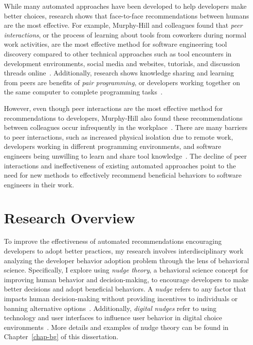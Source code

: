 
While many automated approaches have been developed to help developers make better choices, research shows that face-to-face recommendations between humans are the most effective. For example, Murphy-Hill and colleagues found that \textit{peer interactions}, or the process of learning about tools from coworkers during normal work activities, are the most effective method for software engineering tool discovery compared to other technical approaches such as tool encounters in development environments, social media and websites, tutorials, and discussion threads online~\cite{Murphy-Hill2011PeerInteraction}. Additionally, research shows knowledge sharing and learning from peers are benefits of \textit{pair programming}, or developers working together on the same computer to complete programming tasks~\cite{Cockburn01Pair}.

However, even though peer interactions are the most effective method for recommendations to developers, Murphy-Hill also found these recommendations between colleagues occur infrequently in the workplace~\cite{Murphy-Hill2011PeerInteraction}. There are many barriers to peer interactions, such as increased physical isolation due to remote work, developers working in different programming environments, and software engineers being unwilling to learn and share tool knowledge~\cite{Murphy-Hill2015HowDoUsers}. The decline of peer interactions and ineffectiveness of existing automated approaches point to the need for new methods to effectively recommend beneficial behaviors to software engineers in their work.


\section{Research Overview}

To improve the effectiveness of automated recommendations encouraging developers to adopt better practices, my research involves interdisciplinary work analyzing the developer behavior adoption problem through the lens of behavioral science. Specifically, I explore using \textit{nudge theory}, a behavioral science concept for improving human behavior and decision-making, to encourage developers to make better decisions and adopt beneficial behaviors. A \textit{nudge} refers to any factor that impacts human decision-making without providing incentives to individuals or banning alternative options~\cite{nudge}. Additionally, \textit{digital nudges} refer to using technology and user interfaces to influence user behavior in digital choice environments~\cite{weinmann2016digitalnudging}. More details and examples of nudge theory can be found in Chapter~\ref{chap-bg} of this dissertation.

